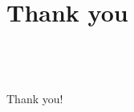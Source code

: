 \section{Thank you}
\begin{frame}
	\frametitle{}
	$\ $\par
	$\ $\par
	$\ $\par
	$\ $\par
	\Huge
	\center
	\textcolor[rgb]{0.64,0.28,0.64}{Thank you!}
\end{frame}
